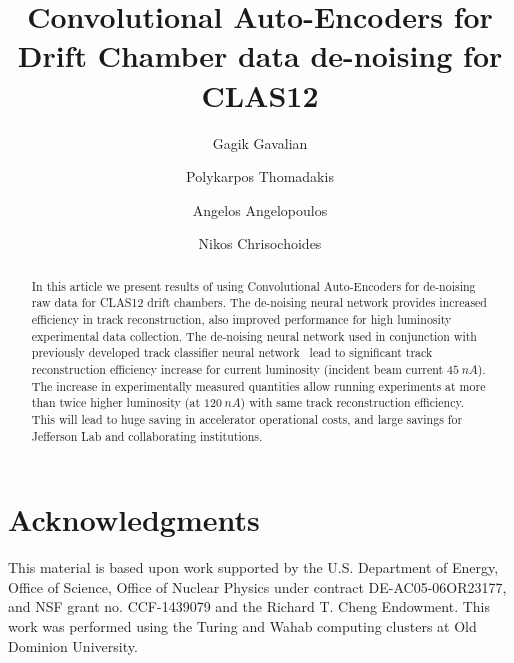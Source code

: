 \documentclass[preprint,12pt]{elsarticle}
\title{Convolutional Auto-Encoders for Drift Chamber data de-noising for CLAS12}
\author[1]{Gagik Gavalian}
\author[2]{Polykarpos Thomadakis}
\author[2]{Angelos Angelopoulos}
\author[2]{Nikos Chrisochoides}
\begin{document}
\begin{abstract}
In this article we present results of using Convolutional Auto-Encoders for de-noising raw data for CLAS12 drift chambers.
The de-noising neural network provides increased efficiency in track reconstruction, also improved performance for high 
luminosity experimental data collection. The de-noising neural network used in conjunction with previously developed track 
classifier neural network~\cite{Gavalian:2022hfa} lead to significant track reconstruction efficiency increase for current luminosity
(incident beam current $45~nA$). The increase in experimentally measured quantities allow running experiments at more than 
twice higher luminosity (at $120~nA$) with same track reconstruction efficiency. This will lead to huge saving in accelerator 
operational costs, and large savings for Jefferson Lab and collaborating institutions.
\end{abstract}
\maketitle














%
%



\newpage

\section{Acknowledgments}

This material is based upon work supported by the U.S. Department of Energy, Office of Science,
Office of Nuclear Physics under contract DE-AC05-06OR23177, and NSF grant no. CCF-1439079 and
the Richard T. Cheng Endowment. This work was performed using the Turing and Wahab computing
clusters at Old Dominion University.
 
\newpage


\end{document}
